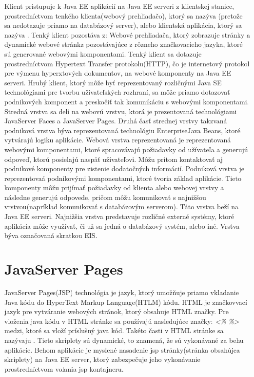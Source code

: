 Klient pristupuje k Java EE aplikácií na Java EE serveri z klientskej stanice, prostredníctvom tenkého klienta(webový prehliadačo), ktorý sa nazýva (pretože sa nedotazuje priamo na databázový server), alebo klientská aplikácia, ktorý sa nazýva . Tenký klient pozostáva z:  Webové prehliadača, ktorý zobrazuje stránky a dynamické webové stránkz pozostávajúce  z rôzneho značkovacieho jazyka, ktoré sú generované webovými komponentami. Tenký klient sa dotazuje prostredníctvom Hypertext Transfer protokolu(HTTP), čo je internetový protokol pre výmenu hyperxtových dokumentov, na webové komponenty na Java EE serveri. Hrubý klient, ktorý môže byť reprezentovaný rozličnými Java SE technológiami pre tvorbu užívateľských rozhraní, sa môže priamo dotazovať podnikových komponent a preskočiť tak komunikáciu s webovými komponentami. \newline \indent Stredná vrstva sa delí na webovú vrstvu, ktorá je prezentovaná technológiami JavaServer Faces a JavaServer Pages. Druhá časť strednej vrstvy takzvaná podniková vrstva býva reprezentovaná technológiu EnterpriseJava Beans, ktoré vytvárajú logiku aplikácie. Webová vrstva reprezentovaná je reprezentovaná webovými komponentami, ktoré spracovávajú požiadavky od užívateľa a generujú odpoveď, ktorú posielajú naspäť užívateľovi. Môžu pritom kontaktovať aj podnikové komponenty pre zistenie dodatočných informácií. Podniková vrstva je reprezentovaá podnikovými komponentami, ktoré tvoria základ aplikácie. Tieto komponenty môžu prijímať požiadavky od klienta alebo webovej vrstvy a následne generujú odpovede, pričom môžu komunikovať s najnižšou vrstvou(napríklad komunikovať s databázovým serverom). Táto vrstva beží na Java EE serveri. \newline \indent Najnižšia vrstva predstavuje rozličné externé systémy, ktoré aplikácia môže využívať, či už sa jedná o databázový systém, alebo iné. Vrstva býva označovaná skratkou EIS.



\section{JavaServer Pages}\label{jspkap}
JavaServer Pages(JSP) technológia je jazyk, ktorý umožňuje priamo vkladanie Java kódu do HyperText Markup Language(HTLM) kódu. HTML je značkovvací jazyk pre vytváranie webových stránok, ktorý obsahuje HTML značky. Pre vloženia java kódu v HTML stránke sa používajú nasledujúce značky: \emph{<\%} \emph{\%>} medzi, ktoré sa vloží príslušný java kód. Takéto časti v HTML stránke sa nazývaju . Tieto skriplety sú dynamické, to znamená, že sú vykonávané za behu aplikácie. Behom aplikácie je myslené nasadenie jsp stránky(stránka obsahújca skriplety) na Java EE server, ktorý zabezpečuje jeho vykonávanie prostredníctvom volania jsp kontajneru.

